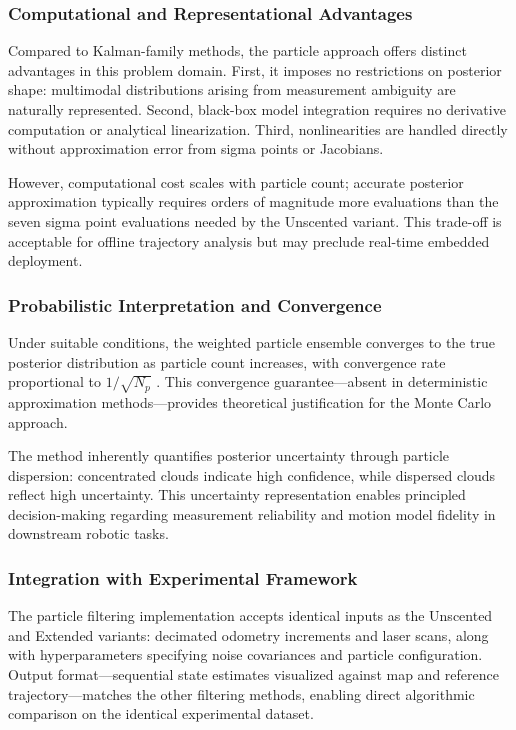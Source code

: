 \documentclass[conference]{IEEEtran}
\begin{document}
\subsubsection{Computational and Representational Advantages}

Compared to Kalman-family methods, the particle approach offers distinct advantages in this problem domain. First, it imposes no restrictions on posterior shape: multimodal distributions arising from measurement ambiguity are naturally represented. Second, black-box model integration requires no derivative computation or analytical linearization. Third, nonlinearities are handled directly without approximation error from sigma points or Jacobians.

However, computational cost scales with particle count; accurate posterior approximation typically requires orders of magnitude more evaluations than the seven sigma point evaluations needed by the Unscented variant. This trade-off is acceptable for offline trajectory analysis but may preclude real-time embedded deployment.

\subsubsection{Probabilistic Interpretation and Convergence}

Under suitable conditions, the weighted particle ensemble converges to the true posterior distribution as particle count increases, with convergence rate proportional to $1/\sqrt{N_p}$ \cite{Elfring2021}. This convergence guarantee—absent in deterministic approximation methods—provides theoretical justification for the Monte Carlo approach.

The method inherently quantifies posterior uncertainty through particle dispersion: concentrated clouds indicate high confidence, while dispersed clouds reflect high uncertainty. This uncertainty representation enables principled decision-making regarding measurement reliability and motion model fidelity in downstream robotic tasks.

\subsubsection{Integration with Experimental Framework}

The particle filtering implementation accepts identical inputs as the Unscented and Extended variants: decimated odometry increments and laser scans, along with hyperparameters specifying noise covariances and particle configuration. Output format—sequential state estimates visualized against map and reference trajectory—matches the other filtering methods, enabling direct algorithmic comparison on the identical experimental dataset.
\end{document}
